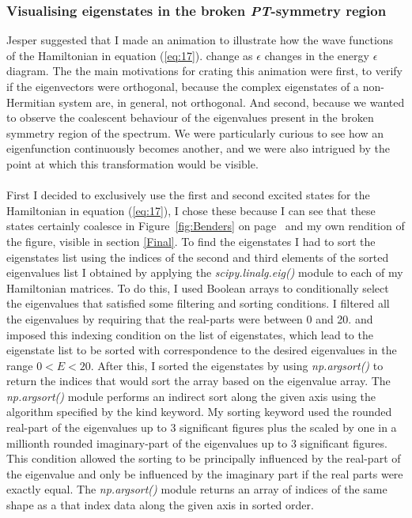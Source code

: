 \documentclass[10pt, a4paper, singlespacing]{report}
\newcommand\PT{\emph{PT}}
\begin{document}
\subsubsection{Visualising eigenstates in the broken \PT-symmetry region}\label{Eigenstates explained}
Jesper suggested that I made an animation to illustrate how the wave functions of the Hamiltonian in equation (\ref{eq:17}). change as $\epsilon$ changes in the energy $\epsilon$ diagram. The the main motivations for crating this animation were first, to verify if the eigenvectors were orthogonal, because the complex eigenstates of a non-Hermitian system are, in general, not orthogonal. And second, because we wanted to observe the coalescent behaviour of the eigenvalues present in the broken symmetry region of the spectrum. We were particularly curious to see how an eigenfunction continuously becomes another, and we were also intrigued by the point at which this transformation would be visible.\\\\
First I decided to exclusively use the first and second excited states for the Hamiltonian in equation (\ref{eq:17}), I chose these because I can see that these states certainly coalesce in Figure~\ref{fig:Benders} on page~\pageref{fig:Benders} and my own rendition of the figure, visible in section \ref{Final}.
To find the eigenstates I had to sort the eigenstates list using the indices of the second and third elements of the sorted eigenvalues list I obtained by applying the \emph{scipy.linalg.eig()} module to each of my Hamiltonian matrices. To do this, I used Boolean arrays to conditionally select the eigenvalues that satisfied some filtering and sorting conditions. I filtered all the eigenvalues by requiring that the real-parts were between 0 and 20. and imposed this indexing condition on the list of eigenstates, which lead to the eigenstate list to be sorted with correspondence to the desired eigenvalues in the range $0< E < 20$.
After this, I sorted the eigenstates by using \emph{np.argsort()} to return the indices that would sort the array based on the eigenvalue array. The \emph{np.argsort()} module performs an indirect sort along the given axis using the algorithm specified by the kind keyword. My sorting keyword used the rounded real-part of the eigenvalues up to 3 significant figures plus the scaled by one in a millionth rounded imaginary-part of the eigenvalues up to 3 significant figures. This condition allowed the sorting to be principally influenced by the real-part of the eigenvalue and only be influenced by the imaginary part if the real parts were exactly equal. The \emph{np.argsort()} module returns an array of indices of the same shape as a that index data along the given axis in sorted order\cite{argsort}.\\
\end{document}
